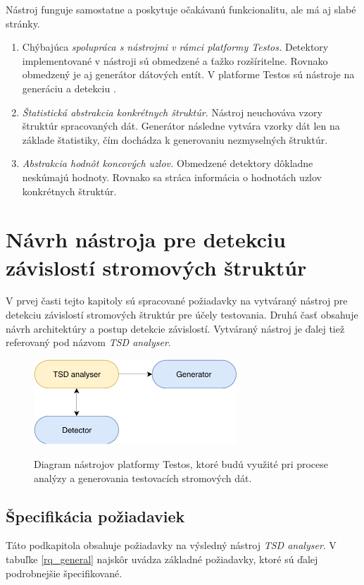 Nástroj funguje samostatne a poskytuje očakávanú funkcionalitu, ale má aj slabé stránky.
\begin{enumerate}
	\item{Chýbajúca \textit{spolupráca s nástrojmi v rámci platformy Testos.} Detektory implementované v nástroji sú obmedzené a ťažko rozšíritelne. Rovnako obmedzený je aj generátor dátových entít. V platforme Testos sú nástroje na generáciu a detekciu .   
	}
	\item{\textit{Štatistická abstrakcia konkrétnych štruktúr.} Nástroj neuchováva vzory štruktúr spracovaných dát. Generátor následne vytvára vzorky dát len na základe štatistiky, čím dochádza k generovaniu nezmyselných štruktúr.
	} 	
	\item{\textit{Abstrakcia hodnôt koncových uzlov.} Obmedzené detektory dôkladne neskúmajú hodnoty. Rovnako sa stráca informácia o hodnotách uzlov konkrétnych štruktúr.
	} 
		
\end{enumerate}



\chapter{Návrh nástroja pre detekciu závislostí stromových štruktúr}
\label{navrh}
V prvej časti tejto kapitoly sú spracované požiadavky na vytváraný nástroj pre detekciu závislostí stromových štruktúr pre účely testovania. Druhá časť obsahuje návrh architektúry a postup detekcie závislostí. Vytváraný nástroj je ďalej tiež referovaný pod názvom \textit{TSD analyser}.
\begin{figure}[h]\centering
	\centering
	\includegraphics[width=3.0in,keepaspectratio]{obrazky-figures/testos_components.pdf}\\[1pt]
	\caption{Diagram nástrojov platformy Testos, ktoré budú využité pri procese analýzy a generovania testovacích stromových dát.}
	\label{testos_nastroje}
\end{figure} 
\section{Špecifikácia požiadaviek}
Táto podkapitola obsahuje požiadavky na výsledný nástroj \textit{TSD analyser}. V tabuľke \ref{rq_general} najskôr uvádza základné požiadavky, ktoré sú ďalej podrobnejšie špecifikované. 

